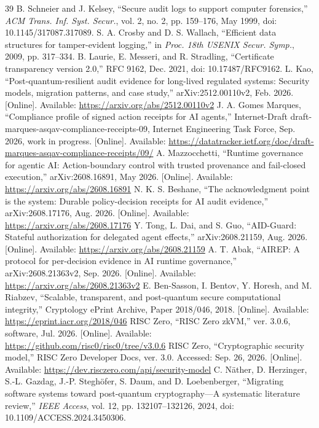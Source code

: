 \begin{thebibliography}{39}
B. Schneier and J. Kelsey, ``Secure audit logs to support computer forensics,'' \emph{ACM Trans. Inf. Syst. Secur.}, vol. 2, no. 2, pp. 159--176, May 1999, doi: 10.1145/317087.317089.
S. A. Crosby and D. S. Wallach, ``Efficient data structures for tamper-evident logging,'' in \emph{Proc. 18th USENIX Secur. Symp.}, 2009, pp. 317--334.
B. Laurie, E. Messeri, and R. Stradling, ``Certificate transparency version 2.0,'' RFC 9162, Dec. 2021, doi: 10.17487/RFC9162.
L. Kao, ``Post-quantum-resilient audit evidence for long-lived regulated systems: Security models, migration patterns, and case study,'' arXiv:2512.00110v2, Feb. 2026. [Online]. Available: \url{https://arxiv.org/abs/2512.00110v2}
J. A. Gomes Marques, ``Compliance profile of signed action receipts for AI agents,'' Internet-Draft draft-marques-asqav-compliance-receipts-09, Internet Engineering Task Force, Sep. 2026, work in progress. [Online]. Available: \url{https://datatracker.ietf.org/doc/draft-marques-asqav-compliance-receipts/09/}
A. Mazzocchetti, ``Runtime governance for agentic AI: Action-boundary control with trusted provenance and fail-closed execution,'' arXiv:2608.16891, May 2026. [Online]. Available: \url{https://arxiv.org/abs/2608.16891}
N. K. S. Beshane, ``The acknowledgment point is the system: Durable policy-decision receipts for AI audit evidence,'' arXiv:2608.17176, Aug. 2026. [Online]. Available: \url{https://arxiv.org/abs/2608.17176}
Y. Tong, L. Dai, and S. Guo, ``AID-Guard: Stateful authorization for delegated agent effects,'' arXiv:2608.21159, Aug. 2026. [Online]. Available: \url{https://arxiv.org/abs/2608.21159}
A. T. Abak, ``AIREP: A protocol for per-decision evidence in AI runtime governance,'' arXiv:2608.21363v2, Sep. 2026. [Online]. Available: \url{https://arxiv.org/abs/2608.21363v2}
E. Ben-Sasson, I. Bentov, Y. Horesh, and M. Riabzev, ``Scalable, transparent, and post-quantum secure computational integrity,'' Cryptology ePrint Archive, Paper 2018/046, 2018. [Online]. Available: \url{https://eprint.iacr.org/2018/046}
RISC Zero, ``RISC Zero zkVM,'' ver. 3.0.6, software, Jul. 2026. [Online]. Available: \url{https://github.com/risc0/risc0/tree/v3.0.6}
RISC Zero, ``Cryptographic security model,'' RISC Zero Developer Docs, ver. 3.0. Accessed: Sep. 26, 2026. [Online]. Available: \url{https://dev.risczero.com/api/security-model}
C. N\"ather, D. Herzinger, S.-L. Gazdag, J.-P. Stegh\"ofer, S. Daum, and D. Loebenberger, ``Migrating software systems toward post-quantum cryptography---A systematic literature review,'' \emph{IEEE Access}, vol. 12, pp. 132107--132126, 2024, doi: 10.1109/ACCESS.2024.3450306.

\end{thebibliography}
